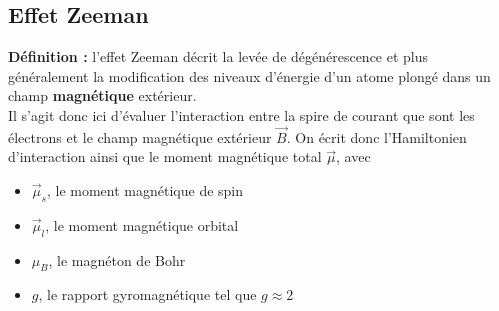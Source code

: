 



\subsection{Effet Zeeman}



\textbf{Définition :} l'effet Zeeman décrit la levée de dégénérescence et plus généralement la modification des niveaux d'énergie d'un atome plongé dans un champ \textbf{magnétique} extérieur.\\
Il s'agit donc ici d'évaluer l'interaction entre la spire de courant que sont les électrons et le champ magnétique extérieur $\vec{B}$. On écrit donc l'Hamiltonien d'interaction ainsi que le moment magnétique total $\vec{\mu}$, avec
\begin{itemize}[label=$\bullet$]
    \item $\vec{\mu}_{s}$, le moment magnétique de spin
    \item $\vec{\mu}_{l}$, le moment magnétique orbital
    \item $\mu_B$, le magnéton de Bohr
    \item $g$, le rapport gyromagnétique tel que $g \approx 2$
\end{itemize}

